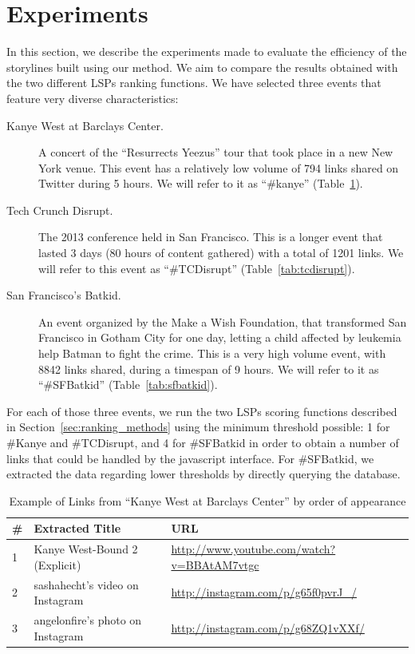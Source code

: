 \documentclass{sig-alternate-somus}
\begin{document}

\section{Experiments}
\label{sec:experiments}
In this section, we describe the experiments made to evaluate the efficiency of the storylines built using our method. We aim to compare the results obtained with the two different LSPs ranking functions. We have selected three events that feature very diverse characteristics:
\begin{description}
 \item[Kanye West at Barclays Center.] A concert of the ``Resurrects Yeezus'' tour that took place in a new New York venue. This event has a relatively low volume of 794 links shared on Twitter during 5 hours. We will refer to it as ``\#kanye'' (Table~\ref{tab:kanye}).
 \item[Tech Crunch Disrupt.] The 2013 conference held in San Francisco. This is a longer event that lasted 3 days (80 hours of content gathered) with a total of 1201 links. We will refer to this event as ``\#TCDisrupt'' (Table~\ref{tab:tcdisrupt}).
 \item[San Francisco's Batkid.] An event organized by the Make a Wish Foundation, that transformed San Francisco in Gotham City for one day, letting a child affected by leukemia help Batman to fight the crime. This is a very high volume event, with 8842 links shared, during a timespan of 9 hours. We will refer to it as ``\#SFBatkid'' (Table~\ref{tab:sfbatkid}).
\end{description}

For each of those three events, we run the two LSPs scoring functions described in Section~\ref{sec:ranking_methods} using the minimum threshold possible: 1 for \#Kanye and \#TCDisrupt, and 4 for \#SFBatkid in order to obtain a number of links that could be handled by the javascript interface. For \#SFBatkid, we extracted the data regarding lower thresholds by directly querying the database.

\begin{table}[htbp]
 \begin{tabular}{| p{0.2cm} | p{3.5cm} | p{3.8cm} |}
  \hline
  \textbf{\#} & \textbf{Extracted Title} & \textbf{URL} \\
  \hline
  1 & Kanye West-Bound 2 (Explicit) & \url{http://www.youtube.com/watch?v=BBAtAM7vtgc} \\
  \hline
  2 & sashahecht's video on Instagram & \url{http://instagram.com/p/g65f0pvrJ_/} \\
  \hline
  3 & angelonfire's photo on Instagram & \url{http://instagram.com/p/g68ZQ1vXXf/} \\
  \hline
 \end{tabular}
 \caption{Example of Links from ``Kanye West at Barclays Center'' by order of appearance}
 \label{tab:kanye}
\end{table}
\end{document}
